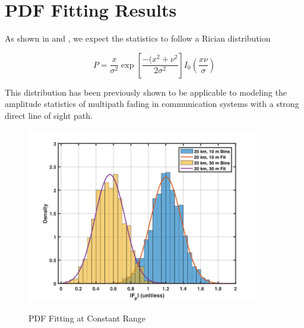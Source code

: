 \section{PDF Fitting Results}
As shown in \cite{yeh_first_principles} and \cite{yeh_fading}, we expect the statistics to follow a Rician distribution

\begin{equation}
P = \frac{x}{\sigma^2}\exp\left[\frac{-(x^2 + \nu^2}{2\sigma^2} \right]I_0\left(\frac{x\nu}{\sigma} \right)
\label{stat_eq:5}
\end{equation}
\renewcommand{\baselinestretch}{2} \small\normalsize

This distribution has been previously shown to be applicable to modeling the amplitude statistics of multipath fading in communication systems with a strong direct line of sight path.

\begin{figure}[H]
  \begin{center}
\includegraphics[width=4in]{../media/statistics/constant_range_fit.png}
  \end{center}
  \renewcommand{\baselinestretch}{1} \small\normalsize
  \begin{quote}
    \caption[PDF Fitting at Constant Range]{PDF Fitting at Constant Range\label{stat_fig:4}}
  \end{quote}
\end{figure}
\renewcommand{\baselinestretch}{2} \small\normalsize

